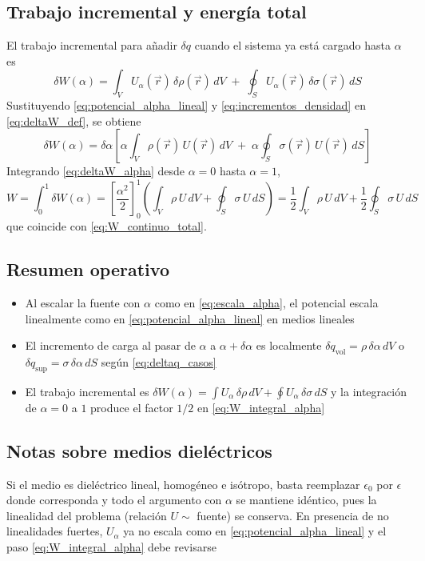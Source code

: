 \documentclass{article}
\begin{document}
\subsection{Trabajo incremental y energía total}
El trabajo incremental para añadir $\delta q$ cuando el sistema ya está cargado hasta $\alpha$ es
\begin{equation}
\label{eq:deltaW_def}
\delta W(\alpha)=\int_V U_\alpha(\vec r)\,\delta\rho(\vec r)\,dV \;+\;\oint_S U_\alpha(\vec r)\,\delta\sigma(\vec r)\,dS
\end{equation}
Sustituyendo \eqref{eq:potencial_alpha_lineal} y \eqref{eq:incrementos_densidad} en \eqref{eq:deltaW_def}, se obtiene
\begin{equation}
\label{eq:deltaW_alpha}
\delta W(\alpha)=\delta\alpha\left[\alpha\int_V \rho(\vec r)\,U(\vec r)\,dV \;+\;\alpha\oint_S \sigma(\vec r)\,U(\vec r)\,dS\right]
\end{equation}
Integrando \eqref{eq:deltaW_alpha} desde $\alpha=0$ hasta $\alpha=1$,
\begin{equation}
\label{eq:W_integral_alpha}
W=\int_{0}^{1}\delta W(\alpha)
=\left[\frac{\alpha^{2}}{2}\right]_{0}^{1}\left(\int_V \rho\,U\,dV+\oint_S \sigma\,U\,dS\right)
=\frac{1}{2}\int_V \rho\,U\,dV+\frac{1}{2}\oint_S \sigma\,U\,dS
\end{equation}
que coincide con \eqref{eq:W_continuo_total}.

\subsection{Resumen operativo}
\begin{itemize}
\item Al escalar la fuente con $\alpha$ como en \eqref{eq:escala_alpha}, el potencial escala linealmente como en \eqref{eq:potencial_alpha_lineal} en medios lineales
\item El incremento de carga al pasar de $\alpha$ a $\alpha+\delta\alpha$ es localmente \(\delta q_{\text{vol}}=\rho\,\delta\alpha\,dV\) o \(\delta q_{\text{sup}}=\sigma\,\delta\alpha\,dS\) según \eqref{eq:deltaq_casos}
\item El trabajo incremental es \(\delta W(\alpha)=\int U_\alpha\,\delta\rho\,dV+\oint U_\alpha\,\delta\sigma\,dS\) y la integración de \(\alpha=0\) a \(1\) produce el factor \(1/2\) en \eqref{eq:W_integral_alpha}
\end{itemize}

\subsection{Notas sobre medios dieléctricos}
Si el medio es dieléctrico lineal, homogéneo e isótropo, basta reemplazar $\epsilon_0$ por $\epsilon$ donde corresponda y todo el argumento con $\alpha$ se mantiene idéntico, pues la linealidad del problema (relación $U\sim$ fuente) se conserva. En presencia de no linealidades fuertes, $U_\alpha$ ya no escala como en \eqref{eq:potencial_alpha_lineal} y el paso \eqref{eq:W_integral_alpha} debe revisarse
	
\end{document}
